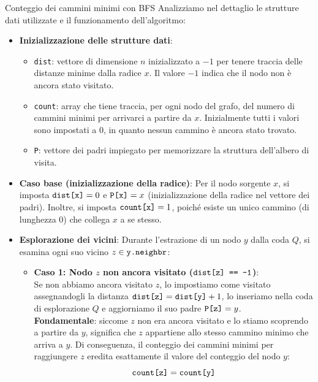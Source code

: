\documentclass[12pt]{report}
\begin{document}
	\begin{algoritmo}{Conteggio dei cammini minimi con BFS}{}
		Analizziamo nel dettaglio le strutture dati utilizzate e il funzionamento dell'algoritmo:
		
		\begin{itemize}
			\item \textbf{Inizializzazione delle strutture dati}:
			\begin{itemize}
				\item \texttt{dist}: vettore di dimensione $n$ inizializzato a $-1$ per tenere traccia delle distanze minime dalla radice $x$. Il valore $-1$ indica che il nodo non è ancora stato visitato.
				
				\item \texttt{count}: array che tiene traccia, per ogni nodo del grafo, del numero di cammini minimi per arrivarci a partire da $x$. Inizialmente tutti i valori sono impostati a $0$, in quanto nessun cammino è ancora stato trovato.
				
				\item \texttt{P}: vettore dei padri impiegato per memorizzare la struttura dell'albero di visita.
			\end{itemize}
			
			\item \textbf{Caso base (inizializzazione della radice)}:
			Per il nodo sorgente $x$, si imposta $\text{\texttt{dist[x]}} = 0$ e $\text{\texttt{P[x]}} = x$ (inizializzazione della radice nel vettore dei padri). Inoltre, si imposta $\text{\texttt{count[x]}} = 1$, poiché esiste un unico cammino (di lunghezza $0$) che collega $x$ a se stesso.
			
			\item \textbf{Esplorazione dei vicini}:
			Durante l'estrazione di un nodo $y$ dalla coda $Q$, si esamina ogni suo vicino $z \in \text{\texttt{y.neighbr}}$:
			\begin{itemize}
				\item \textbf{Caso 1: Nodo $z$ non ancora visitato ($\text{\texttt{dist[z] == -1}}$)}:\\
				Se non abbiamo ancora visitato $z$, lo impostiamo come visitato assegnandogli la distanza $\text{\texttt{dist[z]}} = \text{\texttt{dist[y]}} + 1$, lo inseriamo nella coda di esplorazione $Q$ e aggiorniamo il suo padre $\text{\texttt{P[z]}} = y$.\\
				\textbf{Fondamentale}: siccome $z$ non era ancora visitato e lo stiamo scoprendo a partire da $y$, significa che $z$ appartiene allo stesso cammino minimo che arriva a $y$. Di conseguenza, il conteggio dei cammini minimi per raggiungere $z$ eredita esattamente il valore del conteggio del nodo $y$:
				\[
				\text{\texttt{count[z]}} = \text{\texttt{count[y]}}
				\]
				

\end{itemize}
\end{itemize}
\end{algoritmo}
\end{document}
